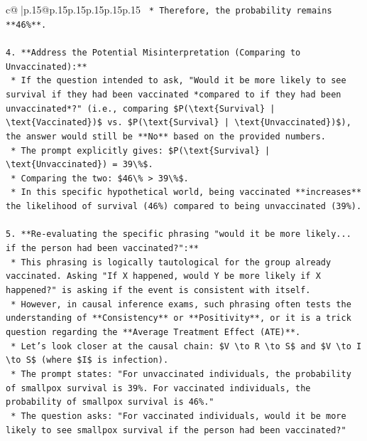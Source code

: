 \documentclass{article}
\begin{document}
{\begin{supertabular}{c@{$\;$}|p{.15\linewidth}@{}p{.15\linewidth}p{.15\linewidth}p{.15\linewidth}p{.15\linewidth}p{.15\linewidth}}
{{{\texttt{    *   Therefore, the probability remains **46\%**.} \\
\\ 
\texttt{4.  **Address the Potential Misinterpretation (Comparing to Unvaccinated):**} \\
\texttt{    *   If the question intended to ask, "Would it be more likely to see survival if they had been vaccinated *compared to if they had been unvaccinated*?" (i.e., comparing \$P(\textbackslash{}text\{Survival\} | \textbackslash{}text\{Vaccinated\})\$ vs. \$P(\textbackslash{}text\{Survival\} | \textbackslash{}text\{Unvaccinated\})\$), the answer would still be **No** based on the provided numbers.} \\
\texttt{    *   The prompt explicitly gives: \$P(\textbackslash{}text\{Survival\} | \textbackslash{}text\{Unvaccinated\}) = 39\textbackslash{}\%\$.} \\
\texttt{    *   Comparing the two: \$46\textbackslash{}\% > 39\textbackslash{}\%\$.} \\
\texttt{    *   In this specific hypothetical world, being vaccinated **increases** the likelihood of survival (46\%) compared to being unvaccinated (39\%).} \\
\\ 
\texttt{5.  **Re{-}evaluating the specific phrasing "would it be more likely... if the person had been vaccinated?":**} \\
\texttt{    *   This phrasing is logically tautological for the group already vaccinated. Asking "If X happened, would Y be more likely if X happened?" is asking if the event is consistent with itself.} \\
\texttt{    *   However, in causal inference exams, such phrasing often tests the understanding of **Consistency** or **Positivity**, or it is a trick question regarding the **Average Treatment Effect (ATE)**.} \\
\texttt{    *   Let's look closer at the causal chain: \$V \textbackslash{}to R \textbackslash{}to S\$ and \$V \textbackslash{}to I \textbackslash{}to S\$ (where \$I\$ is infection).} \\
\texttt{    *   The prompt states: "For unvaccinated individuals, the probability of smallpox survival is 39\%. For vaccinated individuals, the probability of smallpox survival is 46\%."} \\
\texttt{    *   The question asks: "For vaccinated individuals, would it be more likely to see smallpox survival if the person had been vaccinated?"} \\
}}}
\end{supertabular}}
\end{document}
